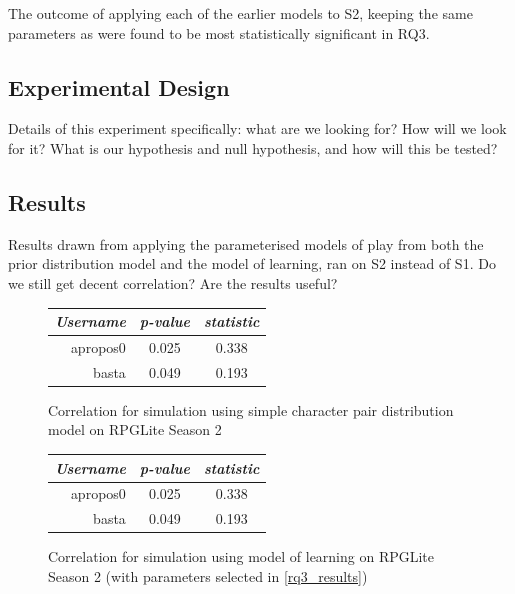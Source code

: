The outcome of applying each of the earlier models to S2, keeping the same
parameters as were found to be most statistically significant in RQ3.

\subsection{Experimental Design}

Details of this experiment specifically: what are we looking for? How will we
look for it? What is our hypothesis and null hypothesis, and how will this be
tested?

\subsection{Results}

Results drawn from applying the parameterised models of play from both the prior
distribution model and the model of learning, ran on S2 instead of S1. Do we
still get decent correlation? Are the results useful?



\begin{figure}[h]
  \centering
  
  \begin{minipage}{.45\textwidth}
  \centering
  \begin{tabular}{r|c|c}
    \emph{Username} & \emph{p-value} & \emph{\tau{} statistic} \\\hline\hline
    apropos0 & 0.025 & 0.338 \\
    basta & 0.049 & 0.193 \\
  \end{tabular}
  \caption{Correlation for simulation using simple character pair distribution model on RPGLite Season 2}
  \label{prior_distribution_model_results_s2}
  \end{minipage}\hfill
  \begin{minipage}{.45\textwidth}
  \centering
  \begin{tabular}{r|c|c}
    \emph{Username} & \emph{p-value} & \emph{\tau{} statistic} \\\hline\hline
    apropos0 & 0.025 & 0.338 \\
    basta & 0.049 & 0.193 \\
  \end{tabular}
  \caption{Correlation for simulation using \aspectoriented model of learning on RPGLite Season 2 (with parameters selected in \cref{rq3_results})}
  \label{learning_model_results_s2}
  \end{minipage}
  

\end{figure}






